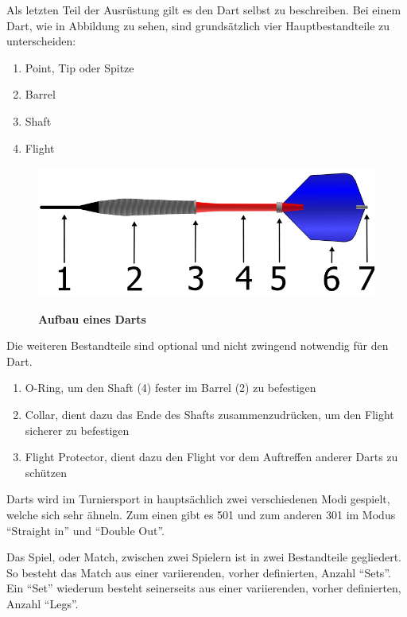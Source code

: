Als letzten Teil der Ausrüstung gilt es den Dart selbst zu beschreiben. Bei einem Dart, wie in Abbildung  zu sehen, sind grundsätzlich vier Hauptbestandteile zu unterscheiden:
\begin{enumerate}
    \item Point, Tip oder Spitze
    \item Barrel
    \addtocounter{enumi}{1}
    \item Shaft
    \addtocounter{enumi}{1}
    \item Flight
\end{enumerate}
\begin{figure}
\includegraphics[width=\textwidth]{media/Dart}\\
\caption{\textbf{Aufbau eines Darts\cite{dart2006}}
}
\label{Fig:darts}
\end{figure}
Die weiteren Bestandteile sind optional und nicht zwingend notwendig für den Dart. 
\begin{enumerate}
	\addtocounter{enumi}{1}
	\addtocounter{enumi}{1}
    \item O-Ring, um den Shaft (4) fester im Barrel (2) zu befestigen
    \addtocounter{enumi}{1}
    \item Collar, dient dazu das Ende des Shafts zusammenzudrücken, um den Flight sicherer zu befestigen
    \addtocounter{enumi}{1}
    \item Flight Protector, dient dazu den Flight vor dem Auftreffen anderer Darts zu schützen

\end{enumerate}

Darts wird im Turniersport in hauptsächlich zwei verschiedenen Modi gespielt, welche sich sehr ähneln. Zum einen gibt es 501 und zum anderen 301 im Modus "`Straight in"'  und  "`Double Out"'.

Das Spiel, oder Match, zwischen zwei Spielern ist in zwei Bestandteile gegliedert. So besteht das Match aus einer variierenden, vorher definierten, Anzahl "`Sets"'. Ein "`Set"' wiederum besteht seinerseits aus einer variierenden, vorher definierten, Anzahl "`Legs"'.

